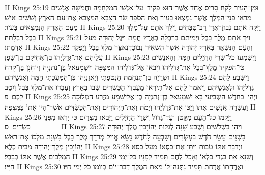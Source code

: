 II Kings 25:19	וּמִן־הָעִיר לָקַח סָרִיס אֶחָד אֲשֶׁר־הוּא פָקִיד  עַל־אַנְשֵׁי הַמִּלְחָמָה וַחֲמִשָּׁה אֲנָשִׁים מֵרֹאֵי פְנֵי־הַמֶּלֶךְ אֲשֶׁר נִמְצְאוּ בָעִיר וְאֵת הַסֹּפֵר שַׂר הַצָּבָא הַמַּצְבִּא אֶת־עַם הָאָרֶץ וְשִׁשִּׁים אִישׁ מֵעַם הָאָרֶץ הַנִּמְצְאִים בָּעִיר׃
II Kings 25:20	וַיִּקַּח אֹתָם נְבוּזַרְאֲדָן רַב־טַבָּחִים וַיֹּלֶךְ אֹתָם עַל־מֶלֶךְ בָּבֶל רִבְלָתָה׃
II Kings 25:21	וַיַּךְ אֹתָם מֶלֶךְ בָּבֶל וַיְמִיתֵם בְּרִבְלָה בְּאֶרֶץ חֲמָת וַיִּגֶל יְהוּדָה מֵעַל אַדְמָתוֹ׃
II Kings 25:22	וְהָעָם הַנִּשְׁאָר בְּאֶרֶץ יְהוּדָה אֲשֶׁר הִשְׁאִיר נְבוּכַדְנֶאצַּר מֶלֶךְ בָּבֶל וַיַּפְקֵד עֲלֵיהֶם אֶת־גְּדַלְיָהוּ בֶּן־אֲחִיקָם בֶּן־שָׁפָן׃
II Kings 25:23	וַיִּשְׁמְעוּ כל־שָׂרֵי הַחֲיָלִים הֵמָּה וְהָאֲנָשִׁים כִּי־הִפְקִיד מֶלֶךְ־בָּבֶל אֶת־גְּדַלְיָהוּ וַיָּבֹאוּ אֶל־גְּדַלְיָהוּ הַמִּצְפָּה וְיִשְׁמָעֵאל בֶּן־נְתַנְיָה וְיוֹחָנָן בֶּן־קָרֵחַ וּשְׂרָיָה בֶן־תַּנְחֻמֶת הַנְּטֹפָתִי וְיַאֲזַנְיָהוּ בֶּן־הַמַּעֲכָתִי הֵמָּה וְאַנְשֵׁיהֶם׃
II Kings 25:24	וַיִּשָּׁבַע לָהֶם גְּדַלְיָהוּ וּלְאַנְשֵׁיהֶם וַיֹּאמֶר לָהֶם אַל־תִּירְאוּ מֵעַבְדֵי הַכַּשְׂדִּים שְׁבוּ בָאָרֶץ וְעִבְדוּ אֶת־מֶלֶךְ בָּבֶל וְיִטַב לָכֶם׃ {פ}
II Kings 25:25	וַיְהִי  בַּחֹדֶשׁ הַשְּׁבִיעִי בָּא יִשְׁמָעֵאל בֶּן־נְתַנְיָה בֶּן־אֱלִישָׁמָע מִזֶּרַע הַמְּלוּכָה וַעֲשָׂרָה אֲנָשִׁים אִתּוֹ וַיַּכּוּ אֶת־גְּדַלְיָהוּ וַיָּמֹת וְאֶת־הַיְּהוּדִים וְאֶת־הַכַּשְׂדִּים אֲשֶׁר־הָיוּ אִתּוֹ בַּמִּצְפָּה׃
II Kings 25:26	וַיָּקֻמוּ כל־הָעָם מִקָּטֹן וְעַד־גָּדוֹל וְשָׂרֵי הַחֲיָלִים וַיָּבֹאוּ מִצְרָיִם כִּי יָרְאוּ מִפְּנֵי כַשְׂדִּים׃ {ס}        
II Kings 25:27	וַיְהִי בִשְׁלֹשִׁים וָשֶׁבַע שָׁנָה לְגָלוּת יְהוֹיָכִין מֶלֶךְ־יְהוּדָה בִּשְׁנֵים עָשָׂר חֹדֶשׁ בְּעֶשְׂרִים וְשִׁבְעָה לַחֹדֶשׁ נָשָׂא אֱוִיל מְרֹדַךְ מֶלֶךְ בָּבֶל בִּשְׁנַת מלְכוֹ אֶת־רֹאשׁ יְהוֹיָכִין מֶלֶךְ־יְהוּדָה מִבֵּית כֶּלֶא׃
II Kings 25:28	וַיְדַבֵּר אִתּוֹ טֹבוֹת וַיִּתֵּן אֶת־כִּסְאוֹ מֵעַל כִּסֵּא הַמְּלָכִים אֲשֶׁר אִתּוֹ בְּבָבֶל׃
II Kings 25:29	וְשִׁנָּא אֵת בִּגְדֵי כִלְאוֹ וְאָכַל לֶחֶם תָּמִיד לְפָנָיו כּל־יְמֵי חַיָּיו׃
II Kings 25:30	וַאֲרֻחָתוֹ אֲרֻחַת תָּמִיד נִתְּנָה־לּוֹ מֵאֵת הַמֶּלֶךְ דְּבַר־יוֹם בְּיוֹמוֹ כֹּל יְמֵי חַיָּו׃
